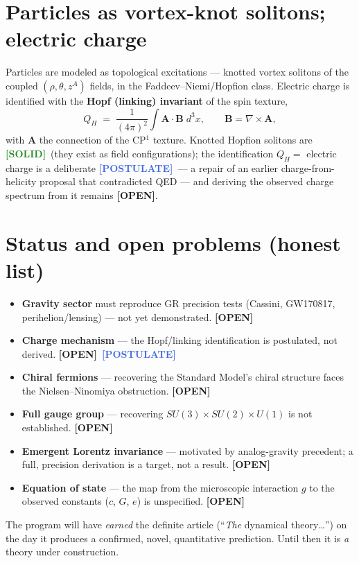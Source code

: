 \documentclass[11pt]{article}
\newcommand{\SOLID}{\textcolor{ForestGreen}{\textbf{[SOLID]}}}
\newcommand{\POSTULATE}{\textcolor{RoyalBlue}{\textbf{[POSTULATE]}}}
\newcommand{\OPENP}{\textcolor{BurntOrange}{\textbf{[OPEN]}}}
\begin{document}
\section{Particles as vortex-knot solitons; electric charge}
\label{sec:charge}
Particles are modeled as topological excitations --- knotted vortex solitons of
the coupled $(\rho,\theta,z^{A})$ fields, in the Faddeev--Niemi/Hopfion class.
Electric charge is identified with the \textbf{Hopf (linking) invariant} of the
spin texture,
\begin{equation}
  Q_H \;=\; \frac{1}{(4\pi)^{2}}\int \mathbf{A}\!\cdot\!\mathbf{B}\; d^{3}x ,
  \qquad \mathbf{B}=\nabla\times\mathbf{A},
\end{equation}
with $\mathbf{A}$ the connection of the CP$^1$ texture. Knotted Hopfion solitons
are \SOLID\ (they exist as field configurations); the identification $Q_H\!=\!$
electric charge is a deliberate \POSTULATE\ --- a repair of an earlier
charge-from-helicity proposal that contradicted QED --- and deriving the
observed charge spectrum from it remains \OPENP.

\section{Status and open problems (honest list)}
\begin{itemize}
  \item \textbf{Gravity sector} must reproduce GR precision tests
        (Cassini, GW170817, perihelion/lensing) --- not yet demonstrated. \OPENP
  \item \textbf{Charge mechanism} --- the Hopf/linking identification is
        postulated, not derived. \OPENP\ \POSTULATE
  \item \textbf{Chiral fermions} --- recovering the Standard Model's chiral
        structure faces the Nielsen--Ninomiya obstruction. \OPENP
  \item \textbf{Full gauge group} --- recovering $SU(3)\times SU(2)\times U(1)$
        is not established. \OPENP
  \item \textbf{Emergent Lorentz invariance} --- motivated by analog-gravity
        precedent; a full, precision derivation is a target, not a result. \OPENP
  \item \textbf{Equation of state} --- the map from the microscopic interaction
        $g$ to the observed constants ($c$, $G$, $e$) is unspecified. \OPENP
\end{itemize}
The program will have \emph{earned} the definite article (``\emph{The}
dynamical theory\ldots'') on the day it produces a confirmed, novel,
quantitative prediction. Until then it is \emph{a} theory under construction.
\end{document}
